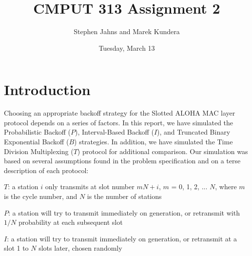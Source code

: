 \documentclass[twocolumn]{article}
\begin{document}
\lstset{
language=C,                             %
basicstyle=\ttfamily,                   %
numbers=left,                           %
numberstyle=\tiny,                      %
stepnumber=1,                           %
numbersep=5pt,                          %
frame=none,                             %
tabsize=2,                              %
captionpos=b,                           %
breaklines=true,                        %
breakatwhitespace=false,                %
showspaces=false,                       %
showtabs=false,                         %
columns=flexible                        %
}

\title{CMPUT 313 Assignment 2}
\date{Tuesday, March 13}
\author{Stephen Jahns and Marek Kundera}

\maketitle

\section*{Introduction}

	Choosing an appropriate backoff strategy for the Slotted ALOHA MAC layer
	protocol depends on a series of factors. In this report, we have
	simulated the Probabilistic Backoff ($P$), Interval-Based Backoff ($I$),
	and Truncated Binary Exponential Backoff ($B$) strategies. In addition,
	we have simulated the Time Division Multiplexing ($T$) protocol for
	additional comparison. Our simulation was based on several assumptions
	found in the problem specification and on a terse description of each
	protocol:

$T$: a station $i$ only transmits at slot number $mN + i$, $m$ = 0, 1, 2, ...
$N$, where $m$ is the cycle number, and $N$ is the number of stations

$P$: a station will try to transmit immediately on generation, or retransmit
with $1/N$ probability at each subsequent slot

$I$: a station will try to transmit immediately on generation, or retransmit at
a slot 1 to $N$ slots later, chosen randomly
\end{document}
